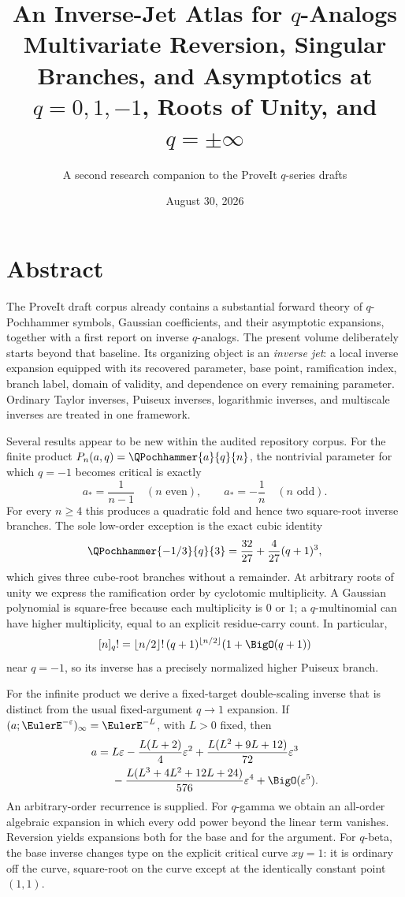 \documentclass[11pt,letterpaper,oneside,openany]{book}
\title{\Huge An Inverse-Jet Atlas for \(q\)-Analogs\\[0.45em]
\Large Multivariate Reversion, Singular Branches, and Asymptotics at\\
\(q=0,1,-1\), Roots of Unity, and \(q=\pm\infty\)}
\author{A second research companion to the ProveIt \(q\)-series drafts}
\date{August 30, 2026}
\theoremstyle{definition}
\theoremstyle{remark}
\begin{document}
\frontmatter
\hypersetup{pageanchor=false}
\maketitle
\clearpage
\hypersetup{pageanchor=true}

\chapter*{Abstract}
The ProveIt draft corpus already contains a substantial forward theory of
\(q\)-Pochhammer symbols, Gaussian coefficients, and their asymptotic
expansions, together with a first report on inverse \(q\)-analogs.  The present
volume deliberately starts beyond that baseline.  Its organizing object is an
\emph{inverse jet}: a local inverse expansion equipped with its recovered
parameter, base point, ramification index, branch label, domain of validity,
and dependence on every remaining parameter.  Ordinary Taylor inverses,
Puiseux inverses, logarithmic inverses, and multiscale inverses are treated in
one framework.

Several results appear to be new within the audited repository corpus.  For the
finite product \(P_n(a,q)=\QPochhammer{a}{q}{n}\), the nontrivial parameter for which
\(q=-1\) becomes critical is exactly
\[
 a_* = \frac1{n-1} \quad(n\text{ even}),
 \qquad
 a_*=-\frac1n \quad(n\text{ odd}).
\]
For every \(n\ge4\) this produces a quadratic fold and hence two square-root
inverse branches.  The sole low-order exception is the exact cubic identity
\[
 \QPochhammer{-1/3}{q}{3}=\frac{32}{27}+\frac4{27}(q+1)^3,
\]
which gives three cube-root branches without a remainder.  At arbitrary roots
of unity we express the ramification order by cyclotomic multiplicity.  A
Gaussian polynomial is square-free because each multiplicity is \(0\) or
\(1\); a \(q\)-multinomial can have higher multiplicity, equal to an explicit
residue-carry count.  In particular,
\[
 [n]_q! = \lfloor n/2\rfloor!\,(q+1)^{\lfloor n/2\rfloor}
       (1+\BigO(q+1))
\]
near \(q=-1\), so its inverse has a precisely normalized higher Puiseux branch.

For the infinite product we derive a fixed-target double-scaling inverse that
is distinct from the usual fixed-argument \(q\to1\) expansion.  If
\((a;\EulerE^{-\varepsilon})_\infty=\EulerE^{-L}\), with \(L>0\) fixed, then
\[
\begin{aligned}
 a={}&L\varepsilon-\frac{L(L+2)}4\varepsilon^2
 +\frac{L(L^2+9L+12)}{72}\varepsilon^3 \\
 &-\frac{L(L^3+4L^2+12L+24)}{576}\varepsilon^4
 +\BigO(\varepsilon^5).
\end{aligned}
\]
An arbitrary-order recurrence is supplied.  For \(q\)-gamma we obtain an
all-order algebraic expansion in which every odd power beyond the linear term
vanishes.  Reversion yields expansions both for the base and for the argument.
For \(q\)-beta, the base inverse changes type on the explicit critical curve
\(xy=1\): it is ordinary off the curve, square-root on the curve except at the
identically constant point \((1,1)\).
\end{document}
